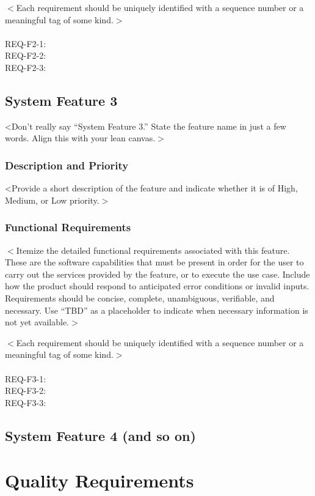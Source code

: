 \documentclass{scrreprt}
\begin{document}
$<$Each requirement should be uniquely identified with a sequence number or a 
meaningful tag of some kind.$>$\\\\
REQ-F2-1:\\
REQ-F2-2:\\
REQ-F2-3:

\section{System Feature 3}
<Don't really say ``System Feature 3.'' State the feature name in just a few words. Align this with your lean canvas.$>$

\subsection{Description and Priority}
<Provide a short description of the feature and indicate whether it is of High, Medium, or Low priority.$>$

\subsection{Functional Requirements}
$<$Itemize the detailed functional requirements associated with this feature.  
These are the software capabilities that must be present in order for the user 
to carry out the services provided by the feature, or to execute the use case.  
Include how the product should respond to anticipated error conditions or 
invalid inputs. Requirements should be concise, complete, unambiguous, 
verifiable, and necessary. Use ``TBD'' as a placeholder to indicate when necessary 
information is not yet available.$>$

$<$Each requirement should be uniquely identified with a sequence number or a 
meaningful tag of some kind.$>$\\\\
REQ-F3-1:\\
REQ-F3-2:\\
REQ-F3-3:

\section{System Feature 4 (and so on)}

\chapter{Quality Requirements}
\end{document}
